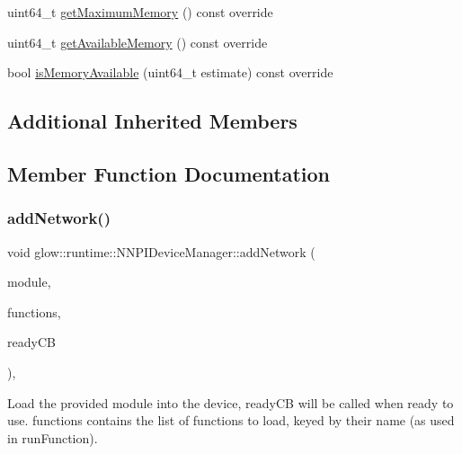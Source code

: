 \begin{DoxyCompactItemize}
uint64\+\_\+t \hyperlink{classglow_1_1runtime_1_1_n_n_p_i_device_manager_ae71ea73f150f1c35a735ba06efa871db}{get\+Maximum\+Memory} () const override
\item 
uint64\+\_\+t \hyperlink{classglow_1_1runtime_1_1_n_n_p_i_device_manager_ab494e0ba08e0859f436ef591c15f7fd5}{get\+Available\+Memory} () const override
\item 
bool \hyperlink{classglow_1_1runtime_1_1_n_n_p_i_device_manager_a543e27b561eef6581859d844565c1ac1}{is\+Memory\+Available} (uint64\+\_\+t estimate) const override
\end{DoxyCompactItemize}
\subsection*{Additional Inherited Members}


\subsection{Member Function Documentation}
\mbox{\label{classglow_1_1runtime_1_1_n_n_p_i_device_manager_a4fcbaacf52744393b047392777c9ae14}} 
\subsubsection{\texorpdfstring{add\+Network()}{addNetwork()}}
{\footnotesize\ttfamily void glow\+::runtime\+::\+N\+N\+P\+I\+Device\+Manager\+::add\+Network (\begin{DoxyParamCaption}\item[{const \hyperlink{classglow_1_1_module}{Module} $\ast$}]{module,  }\item[{Function\+Map\+Ty}]{functions,  }\item[{Ready\+C\+B\+Ty}]{ready\+CB }\end{DoxyParamCaption})\hspace{0.3cm}{\ttfamily [override]}, {\ttfamily [virtual]}}

Load the provided module into the device, ready\+CB will be called when ready to use. {\ttfamily functions} contains the list of functions to load, keyed by their name (as used in run\+Function). 

